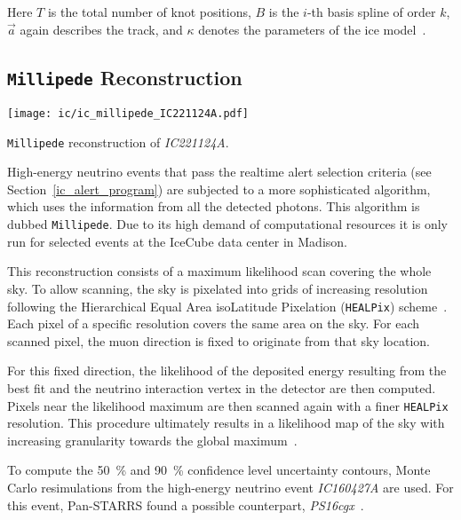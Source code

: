 Here $T$ is the total number of knot positions, $B$ is the $i$-th basis spline of order $k$, $\vec{a}$ again describes the track, and $\kappa$ denotes the parameters of the ice model~\cite{Whitehorn2013}.

\subsection{\texttt{Millipede} Reconstruction}\label{millipede}

\begin{marginfigure}
    \texttt{[image: ic/ic\_millipede\_IC221124A.pdf]}
    \caption[\texttt{Millipede} reconstruction of \emph{IC221124A}]{\texttt{Millipede} reconstruction of \emph{IC221124A}.}
\end{marginfigure}


High-energy neutrino events that pass the realtime alert selection criteria (see Section~\ref{ic_alert_program}) are subjected to a more sophisticated algorithm, which uses the information from all the detected photons. This algorithm is dubbed \texttt{Millipede}. Due to its high demand of computational resources it is only run for selected events at the IceCube data center in Madison.

This reconstruction consists of a maximum likelihood scan covering the whole sky. To allow scanning, the sky is pixelated into grids of increasing resolution following the Hierarchical Equal Area isoLatitude Pixelation (\texttt{HEALPix}) scheme~. Each pixel of a specific resolution covers the same area on the sky. For each scanned pixel, the muon direction is fixed to originate from that sky location.

For this fixed direction, the likelihood of the deposited energy resulting from the best fit and the neutrino interaction vertex in the detector are then computed. Pixels near the likelihood maximum are then scanned again with a finer \texttt{HEALPix} resolution. This procedure ultimately results in a likelihood map of the sky with increasing granularity towards the global maximum~.

To compute the \SI{50}{\percent} and \SI{90}{\percent} confidence level uncertainty contours, Monte Carlo resimulations from the high-energy neutrino event \emph{IC160427A} are used. For this event, Pan-STARRS found a possible counterpart, \emph{PS16cgx}~.

